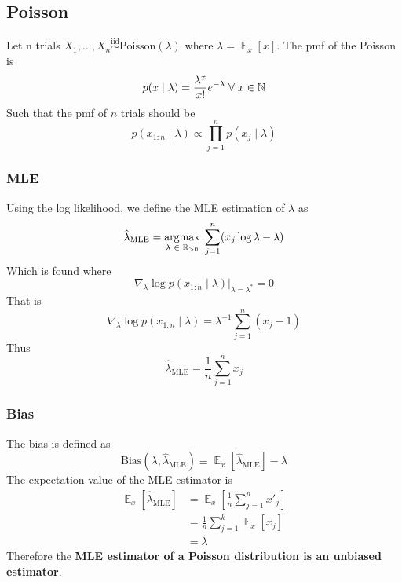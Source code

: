 \documentclass{article}
\DeclareMathOperator{\E}{\mathbb{E}}
\newcommand{\s}{\hspace{0.1cm}}
\numberwithin{equation}{section}
\newcommand{\mle}[1]{\hat{#1}_{\text{MLE}}}
\begin{document}
 \subsection{Poisson}
 Let n trials $X_1,\dots,X_n \overset{\text{iid}}{\sim} \text{Poisson}(\lambda) $ where 
 $\lambda = \E_x[x]$. The 
 pmf of the Poisson is
 \[
         p(x \mid \lambda) = \frac{\lambda^x}{x!} e^{-\lambda}\s \forall \s x \in \mathbb{N}
 \]
 Such that the pmf of $n$ trials should be
  \[
         p(x_{1:n} \mid \lambda) \propto \prod_{j = 1}^n p(x_j \mid \lambda)
 \]
 \subsubsection{MLE}
Using the log likelihood, we define the MLE estimation of $\lambda$ as
 \[
         \hat{\lambda}_{\text{MLE}} = 
                 \underset{\lambda \s \in \s \mathbb{R}_{>0}}{\text{argmax} } 
                \s
        \sum_{j = 1}^n
        (x_j \log \lambda - \lambda)
\]
Which is found where
\[
        \nabla_\lambda \log p(x_{1:n} \mid \lambda ) \bigg|_{\lambda = \lambda^*} = 0
\]
That is
\[
        \nabla_\lambda \log p(x_{1:n} \mid \lambda) = \lambda^{-1} \sum_{j = 1}^n(x_j - 1)
\]
Thus
\[
        \boxed{\hat{\lambda}_{\text{MLE}} = \frac{1}{n}\sum_{j = 1}^n x_j  }
\]


\subsubsection{Bias}
The bias is defined as 
\[
        \text{Bias}(\lambda, \mle{\lambda}) \equiv \E_x[\mle{\lambda}] - \lambda
\]
The expectation value of the MLE estimator is
\begin{align*}
        \E_x[\mle{\lambda}] &= \E_x \left[    \frac{1}{n}\sum_{j=1}^n x'_j \right] \\
                             &= \frac{1}{n} \sum_{j = 1}^k \E_x[x_j] \\
                             &= \lambda
\end{align*} 
Therefore the \textbf{MLE estimator of a Poisson distribution is an unbiased estimator}.
\end{document}
